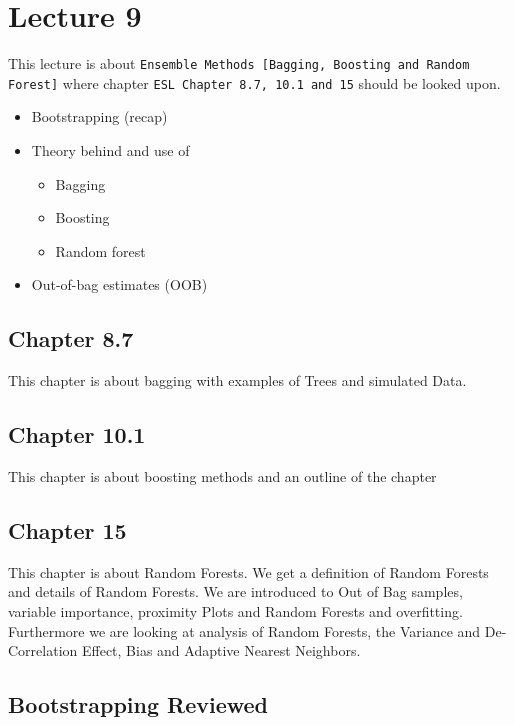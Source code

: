 \chapter{Lecture 9}

This lecture is about \texttt{Ensemble Methods
[Bagging, Boosting and Random Forest]} where chapter \texttt{ESL Chapter 8.7, 10.1
and 15} should be looked upon.

\begin{itemize}
  \item Bootstrapping (recap)
  \item Theory behind and use of
  \begin{itemize}
    \item Bagging
    \item Boosting
    \item Random forest
  \end{itemize}
  \item Out-of-bag estimates (OOB)
\end{itemize}

\section{Chapter 8.7}

This chapter is about bagging with examples of Trees and simulated Data.

\section{Chapter 10.1}

This chapter is about boosting methods and an outline of the chapter

\section{Chapter 15}

This chapter is about Random Forests. We get a definition of Random Forests and details of Random Forests. We are introduced to Out of Bag samples, variable importance, proximity Plots and Random Forests and overfitting. Furthermore we are looking at analysis of Random Forests, the Variance and De-Correlation Effect, Bias and Adaptive Nearest Neighbors.

\section{Bootstrapping Reviewed}

